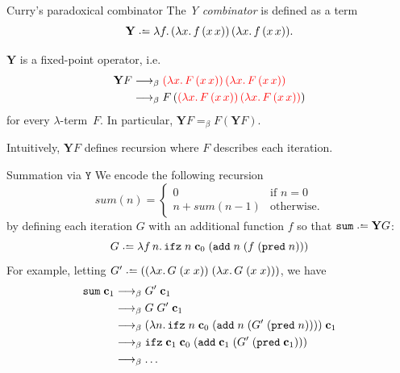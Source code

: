 \begin{frame}{Curry's paradoxical combinator}
  The \emph{Y combinator} is defined as a term 
  \[
    \mathbf{Y} \defeq \lambda f.\, (\lambda x.\, f\,(x\,x))\,(\lambda
    x.\,f\,(x\,x)).
  \]
\begin{proposition}
  $\mathbf{Y}$ is a fixed-point operator, i.e.\ 
  \begin{align*}
    \mathbf{Y}F
    & \longrightarrow_{\beta} {\color{red} (\lambda x.\,F\,(x\,x))\,(\lambda x.\, F\,(x\,x))} \\
    & \longrightarrow_{\beta} F\,({\color{red}(\lambda x.\,F\,(x\,x))\,(\lambda x.\, F\,(x\,x))}) \\
  \end{align*}
  for every $\lambda$-term~$F$. In particular, $\mathbf{Y}F =_\beta F(\mathbf{Y}F)$.
\end{proposition}
Intuitively, $\mathbf{Y}F$ defines recursion where $F$ describes each iteration. 
\end{frame}


\begin{frame}{Summation via $\mathtt{Y}$}
  We encode the following recursion
  \[
    \mathit{sum}(n) =
      \begin{cases} 
       0 & \text{if } n = 0 \\
       n + \mathit{sum}(n - 1)  & \text{otherwise}.
      \end{cases}
  \]
  by defining each iteration $G$ with an additional function $f$ so that $\mathtt{sum} \defeq \mathbf{Y}G$:
  \[
    G \defeq \lambda f\,n.\, \mathtt{ifz}\;n\;\bc_0\; (\add\;n\;(f\;(\mathtt{pred}\;n)))
  \]
  For example, letting $G' \defeq ((\lambda x.\, G\;(x\;x))\;(\lambda x.\,G\;(x\;x)))$, we have
  \begin{align*}
    \mathtt{sum}\;\mathbf{c}_1
      &\longrightarrow_{\beta} G'\;\mathbf{c}_1 \\
      &\longrightarrow_{\beta} G\;G'\;\mathbf{c}_1 \\
      &\longrightarrow_{\beta} (\lambda n.\, \mathtt{ifz}\;n\;\mathbf{c}_0\;
      (\mathtt{add}\;n\;(G'\;(\mathtt{pred}\;n))))\;\mathbf{c}_1 \\
      &\longrightarrow_{\beta} \mathtt{ifz}\;\mathbf{c}_1\;\mathbf{c}_0\;
      (\mathtt{add}\;\mathbf{c}_1\;(G'\;(\mathtt{pred}\;\mathbf{c}_1))) \\
      &\longrightarrow_{\beta} \dots
  \end{align*}
\end{frame}
  
